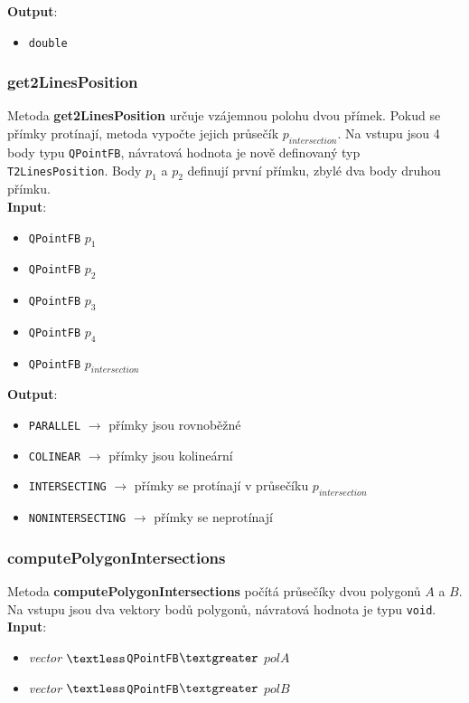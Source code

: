 \documentclass[a4paper, 12pt]{article}
\begin{document}
\textbf{Output}:
\begin{itemize}
\item \texttt{double} 
\end{itemize}

\subsubsection*{get2LinesPosition}
Metoda \textbf{get2LinesPosition} určuje vzájemnou polohu dvou přímek. Pokud se přímky protínají, metoda vypočte jejich průsečík $p_{intersection}$. Na vstupu jsou 4 body typu \texttt{QPointFB}, návratová hodnota je nově definovaný typ \texttt{T2LinesPosition}. Body $p_1$ a $p_2$ definují první přímku, zbylé dva body druhou přímku.\\

\textbf{Input}:
\begin{itemize}
\item \texttt{QPointFB} $p_1$ 
\item \texttt{QPointFB} $p_2$ 
\item \texttt{QPointFB} $p_3$
\item \texttt{QPointFB} $p_4$
\item \texttt{QPointFB} $p_{intersection}$
\end{itemize}

\textbf{Output}:
\begin{itemize}
\item \texttt{PARALLEL} $\rightarrow$ přímky jsou rovnoběžné
\item \texttt{COLINEAR} $\rightarrow$ přímky jsou kolineární
\item \texttt{INTERSECTING} $\rightarrow$ přímky se protínají v průsečíku $p_{intersection}$
\item \texttt{NONINTERSECTING} $\rightarrow$ přímky se neprotínají
\end{itemize}

\subsubsection*{computePolygonIntersections}
Metoda \textbf{computePolygonIntersections} počítá průsečíky dvou polygonů $A$ a $B$. Na vstupu jsou dva vektory bodů polygonů, návratová hodnota je typu \texttt{void}.\\

\textbf{Input}:
\begin{itemize}
\item \textsl{vector} $\textless$\texttt{QPointFB}$\textgreater$ $polA$
\item \textsl{vector} $\textless$\texttt{QPointFB}$\textgreater$ $polB$
\end{itemize}
\end{document}
